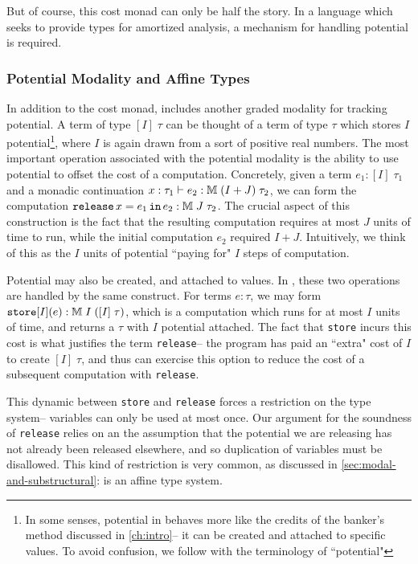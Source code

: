 But of course, this cost monad can only be half the story. In a language which seeks to provide types for amortized analysis, a mechanism for handling potential is required.
 
\subsubsection{Potential Modality and Affine Types}
In addition to the cost monad, \lambdaamor includes another graded modality for tracking potential. A term of type $[I] \; \tau$ can be thought of a term of type $\tau$ which stores $I$ potential\footnote{
In some senses, potential in \lambdaamor behaves more like the credits of the banker's method discussed in \autoref{ch:intro}-- it can be created and attached to specific values. To avoid confusion, we follow \citet{rajani-et-al:popl21} with the terminology of ``potential"
}, where $I$ is again drawn from a sort of positive real numbers.
The most important operation associated with the potential modality is the ability to use potential to offset the cost of a computation. Concretely, given a term $e_1 : [I] \; \tau_1$ and a monadic continuation $x : \tau_1 \vdash e_2 : \mathbb{M} \; (I + J) \; \tau_2$, we can form the computation $\texttt{release}\, x = e_1 \, \texttt{in}\, e_2 : \mathbb{M} \; J \; \tau_2$. The crucial aspect of this construction is the fact that the resulting computation requires at most $J$ units of time to run, while the initial computation $e_2$ required $I + J$. Intuitively, we think of this as the $I$ units of potential ``paying for" $I$ steps of computation. 

Potential may also be created, and attached to values. In \lambdaamor, these two operations are handled by the same construct. For terms $e : \tau$, we may form $\texttt{store}[I](e) : \mathbb{M} \; I \; ([I] \; \tau)$, which is a computation which runs for at most $I$ units of time, and returns a $\tau$ with $I$ potential attached. The fact that \texttt{store} incurs this cost is what justifies the term \texttt{release}-- the program has paid an ``extra" cost of $I$ to create $[I] \; \tau$, and thus can exercise this option to reduce the cost of a subsequent computation with \texttt{release}.

This dynamic between \texttt{store} and \texttt{release} forces a restriction on the type system-- variables can only be used at most once. Our argument for the soundness of \texttt{release} relies on an the assumption that the potential we are releasing has not already been released elsewhere, and so duplication of variables must be disallowed. This kind of restriction is very common, as discussed in \autoref{sec:modal-and-substructural}: \lambdaamor is an affine type system.


